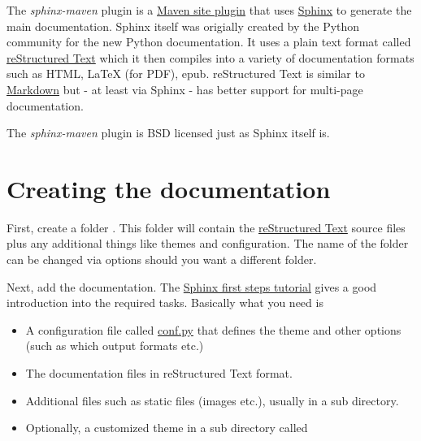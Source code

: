 \documentclass[letterpaper,10pt,english]{sphinxmanual}
\title{${project.name}}
\date{February 17, 2015}
\author{}
\begin{document}
\maketitle
\tableofcontents
{}\label{index::doc}


The \emph{sphinx-maven} plugin is a \href{http://maven.apache.org/plugins/maven-site-plugin/}{Maven site plugin} that uses \href{http://sphinx.pocoo.org/}{Sphinx} to generate the main documentation.
Sphinx itself was origially created by the Python community for the new Python documentation. It uses a
plain text format called \href{http://docutils.sf.net/rst.html}{reStructured Text} which it then compiles into a variety of documentation formats
such as HTML, LaTeX (for PDF), epub. reStructured Text is similar to \href{http://daringfireball.net/projects/markdown/}{Markdown} but - at least via Sphinx -
has better support for multi-page documentation.

The \emph{sphinx-maven} plugin is BSD licensed just as Sphinx itself is.


\chapter{Creating the documentation}
\label{basic-usage:introduction}\label{basic-usage:creating-the-documentation}\label{basic-usage:markdown}\label{basic-usage::doc}\label{basic-usage:contents}
First, create a folder . This folder will contain the \href{http://docutils.sf.net/rst.html}{reStructured Text} source files plus
any additional things like themes and configuration. The name of the folder can be changed via options should
you want a different folder.

Next, add the documentation. The \href{http://sphinx.pocoo.org/tutorial.html}{Sphinx first steps tutorial} gives a good introduction into the required
tasks. Basically what you need is
\begin{itemize}
\item {} 
A configuration file called \href{http://sphinx.pocoo.org/config.html}{conf.py} that defines the theme and other options (such as which output formats etc.)

\item {} 
The documentation files in reStructured Text format.

\item {} 
Additional files such as static files (images etc.), usually in a  sub directory.

\item {} 
Optionally, a customized theme in a sub directory called 

\end{itemize}
\end{document}
